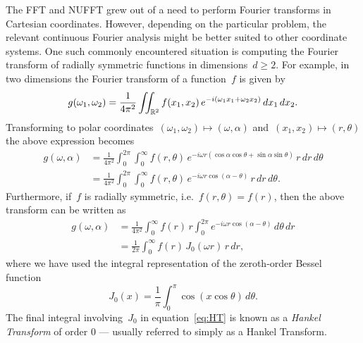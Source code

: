 The FFT and NUFFT grew out of a need to perform Fourier transforms in Cartesian
coordinates. However, depending on the particular problem, the relevant
continuous Fourier analysis might be better suited to other coordinate systems.
One such commonly encountered situation is computing the Fourier transform of
radially symmetric functions in dimensions~$d \geq 2$. For example, in two
dimensions the Fourier transform of a function~$f$ is given by
\begin{equation}
  g(\omega_1, \omega_2) = \frac{1}{4\pi^2} \iint_{\mathbb{R}^2} f(x_1, x_2) \, 
  e^{-i(\omega_1 x_1 + \omega_2 x_2)}  \, dx_1 \, dx_2.
\end{equation}
Transforming to polar coordinates~$(\omega_1,\omega_2) \mapsto (\omega,\alpha)$
and~$(x_1,x_2) \mapsto (r,\theta)$ the above expression becomes
\begin{equation}
  \label{eq:ftpolar}
  \begin{aligned}
    g(\omega, \alpha) &= \frac{1}{4\pi^2} \int_0^{2\pi} \int_0^\infty
    f(r,\theta) \, 
    e^{-i \omega r (\cos\alpha \cos\theta + \sin\alpha \sin\theta) } 
    \, r \, dr \, d\theta \\
  &= \frac{1}{4\pi^2} \int_0^{2\pi} \int_0^\infty f(r,\theta) \, e^{-i \omega r \cos(\alpha-\theta) } \, r \, dr \, d\theta.
  \end{aligned}
\end{equation}
Furthermore, if~$f$ is radially symmetric, i.e.~$f(r, \theta) = f(r)$, then the
above transform can be written as
\begin{equation}
  \label{eq:HT}
  \begin{aligned}
  g(\omega,\alpha) &= \frac{1}{4\pi^2} \int_0^\infty f(r) \, r \int_0^{2\pi} 
  e^{-i \omega r \cos(\alpha - \theta) }  \, d\theta \, dr \\
  &= \frac{1}{2\pi} \int_0^\infty f(r) \, J_0(\omega r) \, r \, dr,
  \end{aligned}
\end{equation}
where we have used the integral representation of the zeroth-order Bessel
function~\cite{olver2010nist}
\begin{equation}
  J_0(x) 
  = \frac{1}{\pi} \int_0^\pi \cos \left( x \cos \theta \right) \, d\theta.
\end{equation}
The final integral involving~$J_0$ in equation~\eqref{eq:HT} is known as a
\emph{Hankel Transform} of order 0 --- usually referred to simply as a Hankel
Transform. 

